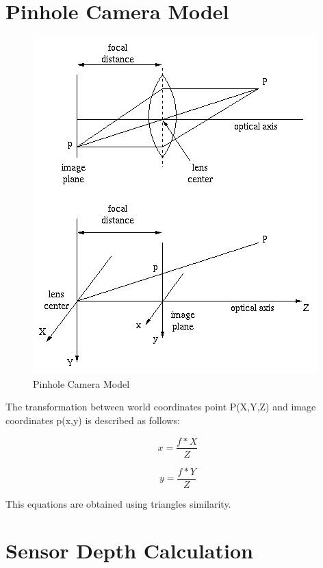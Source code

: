 
\section{Pinhole Camera Model}

\begin{figure}[h!]
\begin{center}
\includegraphics[scale=1]{images/pinhole}
\caption{Pinhole Camera Model}
\label{fig:jan}
\end{center}
\end{figure}


The transformation between world coordinates point P(X,Y,Z) and image coordinates p(x,y) is described as 
follows:

\begin{equation}
\label{eq:disparity2}
 x = \frac{f*X}{Z}
\end{equation}

\begin{equation}
\label{eq:disparity2}
 y = \frac{f*Y}{Z}
\end{equation}

This equations are  obtained using triangles similarity.

\section{Sensor Depth Calculation}

